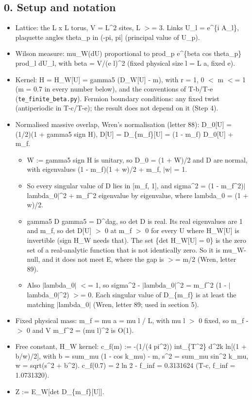 \documentclass[11pt,a4paper]{article}
\begin{document}
\subsection*{0. Setup and notation}
\begin{itemize}
\item{} Lattice: the L x L torus, V = L\textasciicircum{}2 sites, L $>$= 3. Links U\_l = e\textasciicircum{}\{i A\_l\}, plaquette angles theta\_p in (-pi, pi]
(principal value of U\_p).
\item{} Wilson measure: mu\_W(dU) proportional to prod\_p e\textasciicircum{}\{beta cos theta\_p\} prod\_l dU\_l, with beta = V/(e l)\textasciicircum{}2 (fixed
physical size l = L a, fixed e).
\item{} Kernel: H = H\_W[U] = gamma5 (D\_W[U] - m), with r = 1, 0 $<$ m $<$= 1 (m = 0.7 in every number below), and the
conventions of T-b/T-e (\texttt{te\_finite\_beta.py}). Fermion boundary conditions: any fixed twist (antiperiodic in T-c/T-e);
the result does not depend on it (Step 4).
\item{} Normalised massive overlap, Wren's normalisation (letter 88): D\_0[U] = (1/2)(1 + gamma5 sign H),
D[U] = D\_\{m\_f\}[U] = (1 - m\_f) D\_0[U] + m\_f.
\begin{itemize}
\item{} W := gamma5 sign H is unitary, so D\_0 = (1 + W)/2 and D are normal, with eigenvalues (1 - m\_f)(1 + w)/2 + m\_f,
$|$w$|$ = 1.
\item{} So every singular value of D lies in [m\_f, 1], and sigma\textasciicircum{}2 = (1 - m\_f\textasciicircum{}2)$|$lambda\_0$|$\textasciicircum{}2 + m\_f\textasciicircum{}2 eigenvalue by
eigenvalue, where lambda\_0 = (1 + w)/2.
\item{} gamma5 D gamma5 = D\textasciicircum{}dag, so det D is real. Its real eigenvalues are 1 and m\_f, so det D[U] $>$ 0 at m\_f $>$ 0 for
every U where H\_W[U] is invertible (sign H\_W needs that). The set \{det H\_W[U] = 0\} is the zero set of a
real-analytic function that is not identically zero. So it is mu\_W-null, and it does not meet E, where the gap is
$>$= m/2 (Wren, letter 89).
\item{} Also $|$lambda\_0$|$ $<$= 1, so sigma\textasciicircum{}2 - $|$lambda\_0$|$\textasciicircum{}2 = m\_f\textasciicircum{}2 (1 - $|$lambda\_0$|$\textasciicircum{}2) $>$= 0. Each singular value of D\_\{m\_f\}
is at least the matching $|$lambda\_0$|$ (Wren, letter 89; used in section 5).
\end{itemize}

\item{} Fixed physical mass: m\_f = mu a = mu l / L, with mu l $>$ 0 fixed, so m\_f -$>$ 0 and V m\_f\textasciicircum{}2 = (mu l)\textasciicircum{}2 is O(1).
\item{} Free constant, H\_W kernel: c\_f(m) := -(1/(4 pi\textasciicircum{}2)) int\_\{T\textasciicircum{}2\} d\textasciicircum{}2k ln[(1 + b/w)/2], with
b = sum\_mu (1 - cos k\_mu) - m, s\textasciicircum{}2 = sum\_mu sin\textasciicircum{}2 k\_mu, w = sqrt(s\textasciicircum{}2 + b\textasciicircum{}2).
c\_f(0.7) = 2 ln 2 - f\_inf = 0.3131624 (T-c, f\_inf = 1.0731320).
\item{} Z := E\_W[det D\_\{m\_f\}[U]].
\end{itemize}
\end{document}
